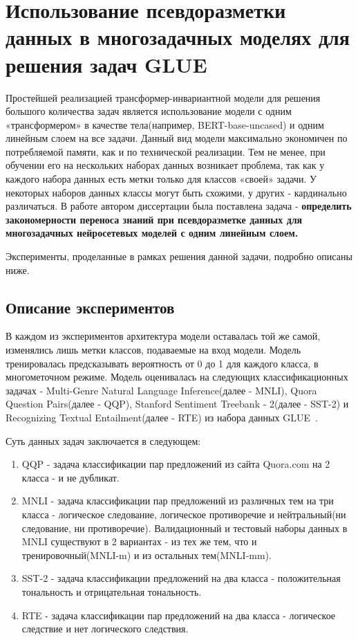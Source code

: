 \chapter{Использование псевдоразметки данных в многозадачных моделях для решения задач GLUE}\label{ch:pseudolabel}

Простейшей реализацией трансформер-инвариантной модели для решения большого количества задач является использование модели с одним «трансформером» в качестве тела(например, BERT-base-uncased) и одним линейным слоем на все задачи. Данный вид модели максимально экономичен по потребляемой памяти, как и по технической реализации. Тем не менее, при обучении его на нескольких наборах данных возникает проблема, так как у каждого набора данных есть метки только для классов «своей» задачи. У некоторых наборов данных классы могут быть схожими, у других - кардинально различаться. В работе \cite{pseudolabel} автором диссертации была поставлена задача - \textbf{определить закономерности переноса знаний при псевдоразметке данных для многозадачных нейросетевых моделей с одним линейным слоем.}

Эксперименты, проделанные в рамках решения данной задачи, подробно описаны ниже.




\section{Описание экспериментов}\label{ch:pseudolabel/sect1}
В каждом из экспериментов архитектура модели оставалась той же самой, изменялись лишь метки классов, подаваемые на вход модели. Модель тренировалась предсказывать вероятность от 0 до 1 для каждого класса, в многометочном режиме.
Модель оценивалась на следующих классификационных задачах - Multi-Genre Natural Language Inference(далее - MNLI), Quora Question Pairs(далее - QQP), Stanford Sentiment Treebank - 2(далее - SST-2) и Recognizing Textual Entailment(далее - RTE) из набора данных GLUE~\cite{wang_2018}. 

Суть данных задач заключается в следующем:
\begin{enumerate}
    \item QQP - задача классификации пар предложений из сайта Quora.com на 2 класса - и не дубликат.
    \item MNLI - задача классификации пар предложений из различных тем на три класса - логическое следование, логическое противоречие и нейтральный(ни следование, ни противоречие). Валидационный и тестовый наборы данных в MNLI существуют в 2 вариантах - из тех же тем, что и тренировочный(MNLI-m) и из остальных тем(MNLI-mm).
    \item SST-2 - задача классификации предложений на два класса - положительная тональность и отрицательная тональность.
    \item RTE -  задача классификации пар предложений на два класса - логическое следствие и нет логического следствия.
\end{enumerate}

